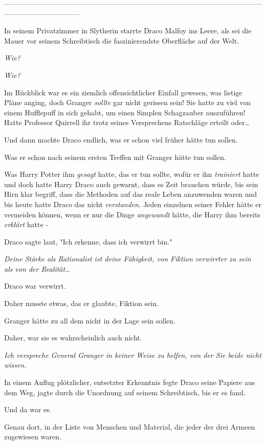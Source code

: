{--------------------------------------------------------------------------------------------------------------------------------------------

In seinem Privatzimmer in Slytherin starrte Draco Malfoy ins Leere, als sei die Mauer vor seinem Schreibtisch die faszinierendste Oberfläche auf der Welt.

\emph{Wie?}

\emph{Wie?}

Im Rückblick war es ein ziemlich offensichtlicher Einfall gewesen, was listige Pläne anging, doch Granger \emph{sollte} gar nicht gerissen sein! Sie hatte zu viel von einem Hufflepuff in sich gehabt, um einen Simplen Schagzauber auszuführen! Hatte Professor Quirrell ihr trotz seines Versprechens Ratschläge erteilt oder…

Und dann machte Draco endlich, was er schon viel früher hätte tun sollen.

Was er schon nach seinem ersten Treffen mit Granger hätte tun sollen.

Was Harry Potter ihm \emph{gesagt} hatte, das er tun sollte, wofür er ihn \emph{trainiert} hatte und doch hatte Harry Draco auch gewarnt, dass es Zeit brauchen würde, bis sein Hirn klar begriff, dass die Methoden auf das reale Leben anzuwenden waren und bis heute hatte Draco das nicht \emph{verstanden.} Jeden einzelnen seiner Fehler hätte er vermeiden können, wenn er nur die Dinge \emph{angewandt} hätte, die Harry ihm bereits \emph{erklärt} hatte -

Draco sagte laut, "Ich erkenne, dass ich verwirrt bin."

\emph{Deine Stärke als Rationalist ist deine Fähigkeit, von Fiktion verwirrter zu sein als von der Realität…}

Draco war verwirrt.

Daher musste etwas, das er glaubte, Fiktion sein.

Granger hätte zu all dem nicht in der Lage sein sollen.

Daher, war sie es wahrscheinlich auch nicht.

\emph{Ich verspreche General Granger in keiner Weise zu helfen, von der Sie beide nicht wissen.}

In einem Anflug plötzlicher, entsetzter Erkenntnis fegte Draco seine Papiere aus dem Weg, jagte durch die Unordnung auf seinem Schreibtisch, bis er es fand.

Und da war es.

Genau dort, in der Liste von Menschen und Material, die jeder der drei Armeen zugewiesen waren.

}
